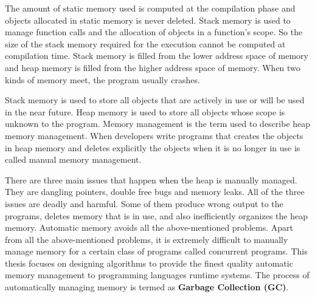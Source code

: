 The amount of static memory used is computed at the compilation phase and objects allocated in static memory is never deleted. Stack memory is used to manage function calls and the allocation of objects in a function's scope. So the size of the stack memory required for the execution cannot be computed at compilation time. Stack memory is filled from the lower address space of memory and heap memory is filled from the higher address space of memory. When two kinds of memory meet, the program usually crashes. 

Stack memory is used to store all objects that are actively in use or will be used in the near future. Heap memory is used to store all objects whose scope is unknown to the program. Memory management is the term used to describe heap memory management. When developers write programs that creates the objects in heap memory and deletes explicitly the objects when it is no longer in use is called manual memory management. 

There are three main issues that happen when the heap is manually managed. They are dangling pointers, double free bugs and memory leaks. All of the three issues are deadly and harmful. Some of them produce wrong output to the programs, deletes memory that is in use, and also inefficiently organizes the heap memory. Automatic memory avoids all the above-mentioned problems. Apart from all the above-mentioned problems, it is extremely difficult to manually manage memory for a certain class of programs called concurrent programs. This thesis focuses on designing algorithms to provide the finest quality automatic memory management to programming languages runtime systems. The process of automatically managing memory is termed as \textbf{Garbage Collection (GC)}.
\begin{comment}
Heap memory helps a developer to extend the life of dynamically allocated objects. Some object allocated in the heap might get a very long life as long as the life of the program running. So these objects have an infinite life if the programmer did not delete them after their last use. The unwanted objects in the heap occupy the heap memory and might make an application run out of memory and exit. In order to avoid pseudo full heap memory errors, programmers determine the life of the dynamically allocated objects and delete them. The dynamically allocated objects can be accessed only by pointers in the static and stack memory. These pointers are also called as \textbf{roots}.
\end{comment}
